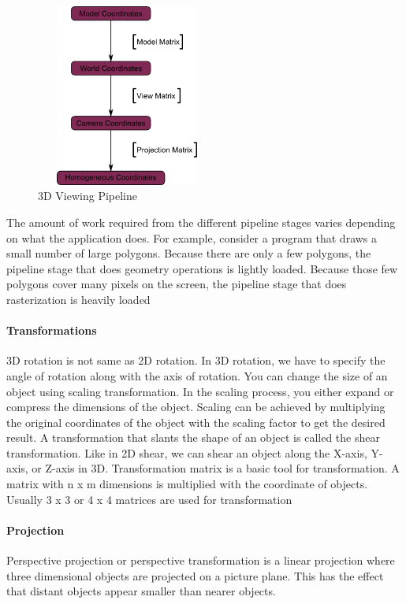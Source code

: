 \documentclass{report}
\begin{document}
    \medskip
    \begin{figure}[h!]
      \centering
        \includegraphics[width=6cm,height=6cm,keepaspectratio]{pipeline.png}
        \caption{3D Viewing Pipeline}
    \end{figure}

The amount of work required from the different pipeline stages varies depending on what the application does. For example, consider a program that draws a small number of large polygons. Because there are only a few polygons, the pipeline stage that does geometry operations is lightly loaded. Because those few polygons cover many pixels on the screen, the pipeline stage that does rasterization is heavily loaded
    \paragraph{Transformations}
        3D rotation is not same as 2D 
        rotation. In 3D rotation, we have to specify the angle of rotation along with the axis of 
        rotation.
        You can change the size of an object using scaling transformation. In the scaling process, 
        you either expand or compress the dimensions of the object. Scaling can be achieved by 
        multiplying the original coordinates of the object with the scaling factor to get the desired 
        result. 
        A transformation that slants the shape of an object is called the shear transformation. Like in 
        2D shear, we can shear an object along the X-axis, Y-axis, or Z-axis in 3D.
        Transformation matrix is a basic tool for transformation. A matrix with n x m dimensions is
        multiplied with the coordinate of objects. Usually 3 x 3 or 4 x 4 matrices are used for 
        transformation
    \paragraph{Projection}
    Perspective projection or perspective transformation is a linear projection where three dimensional 
    objects are projected on a picture plane. This has the effect that distant objects appear smaller 
    than nearer objects.\cite{DUMMY:1}
\end{document}
